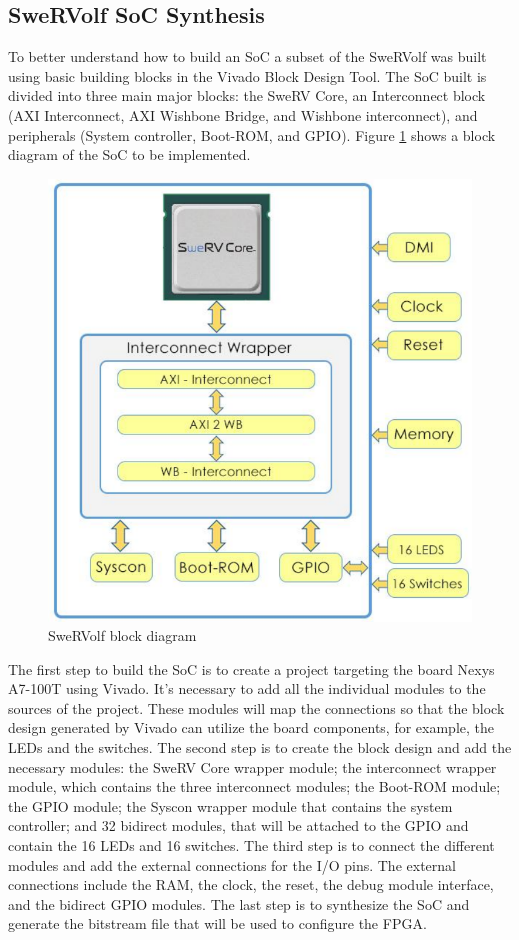 \subsection{SweRVolf SoC Synthesis}
To better understand how to build an SoC a subset of the SweRVolf was built using basic building blocks in the Vivado Block Design Tool. The SoC built is divided into three main major blocks: the SweRV Core, an Interconnect block (AXI Interconnect, AXI Wishbone Bridge, and Wishbone interconnect), and peripherals (System controller, Boot-ROM, and GPIO). Figure \ref{fig:SweRVolf} shows a block diagram of the SoC to be implemented.

\begin{figure}[h]
    \centering
    \includegraphics[scale=0.6]{Figures/SweRVolf.png}
    \caption{SweRVolf block diagram}
    \label{fig:SweRVolf}
\end{figure}

The first step to build the SoC is to create a project targeting the board Nexys A7-100T using Vivado. It's necessary to add all the individual modules to the sources of the project. These modules will map the connections so that the block design generated by Vivado can utilize the board components, for example, the LEDs and the switches. The second step is to create the block design and add the necessary modules: the SweRV Core wrapper module; the interconnect wrapper module, which contains the three interconnect modules; the Boot-ROM module; the GPIO module; the Syscon wrapper module that contains the system controller; and 32 bidirect modules, that will be attached to the GPIO and contain the 16 LEDs and 16 switches. The third step is to connect the different modules and add the external connections for the I/O pins. The external connections include the RAM, the clock, the reset, the debug module interface, and the bidirect GPIO modules. The last step is to synthesize the SoC and generate the bitstream file that will be used to configure the FPGA.


